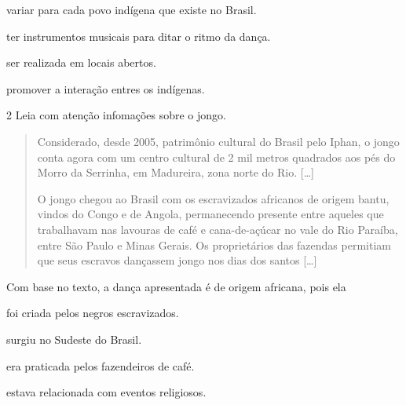 \begin{escolha}
\item variar para cada povo indígena que existe no Brasil.

\item ter instrumentos musicais para ditar o ritmo da dança.

\item ser realizada em locais abertos.

\item promover a interação entres os indígenas.
\end{escolha}



\pagebreak
\num{2} Leia com atenção infomações sobre o jongo.

\begin{quote}
Considerado, desde 2005, patrimônio cultural do Brasil pelo Iphan, o
  jongo conta agora com um centro cultural de 2 mil metros quadrados aos
  pés do Morro da Serrinha, em Madureira, zona norte do Rio. {[}\ldots{}{]}

O jongo chegou ao Brasil com os escravizados africanos de origem bantu,
vindos do Congo e de Angola, permanecendo presente entre aqueles que
trabalhavam nas lavouras de café e cana-de-açúcar no vale do Rio
Paraíba, entre São Paulo e Minas Gerais. Os proprietários das fazendas
permitiam que seus escravos dançassem jongo nos dias dos santos {[}\ldots{}{]}

\end{quote}

\noindent{}Com base no texto, a dança apresentada é de origem africana, pois ela

\begin{escolha}
\item foi criada pelos negros escravizados.

\item surgiu no Sudeste do Brasil.

\item era praticada pelos fazendeiros de café.

\item estava relacionada com eventos religiosos.
\end{escolha}



